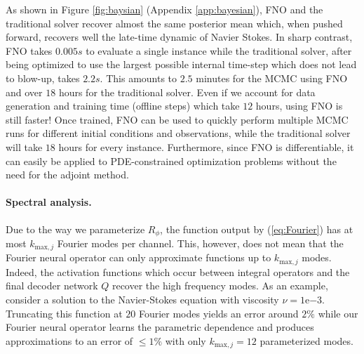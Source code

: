 \documentclass{article} %
\newcommand{\zongyi}[1]{\textcolor{green}{{\bf Zongyi:}  #1}}
\begin{document}
As shown in Figure \ref{fig:baysian} (Appendix \ref{app:bayesian}), FNO and the traditional solver recover almost the same posterior mean which, when pushed forward, recovers well the late-time dynamic of Navier Stokes. 
In sharp contrast, FNO takes $0.005s$ to evaluate a single instance while the traditional solver, after being optimized to use the largest possible internal time-step which does not lead to blow-up, takes $2.2s$. This amounts to $2.5$ minutes for the MCMC using FNO and over $18$ hours for the traditional solver. Even if we account for data generation and training time (offline steps) which take $12$ hours, using FNO is still faster! Once trained, FNO can be used to quickly perform multiple MCMC runs for different initial conditions and observations, while the traditional solver will take $18$ hours for every instance. Furthermore, since FNO is differentiable, it can easily be applied to PDE-constrained optimization problems without the need for the adjoint method.


\paragraph{Spectral analysis.}
Due to the way we parameterize $R_\phi$, the function output by (\ref{eq:Fourier}) has at most $k_{\text{max},j}$ Fourier modes per channel. This, however, does not mean that the Fourier neural operator can only approximate functions up to $k_{\text{max},j}$ modes. Indeed, the activation functions which occur between integral operators and the final decoder network $Q$ recover the high frequency modes.
As an example, consider a solution to the Navier-Stokes equation with viscosity $\nu=1\mathrm{e}{-3}$. Truncating this function at $20$ Fourier modes yields an error around $2\%$ 
while our Fourier neural operator learns the parametric dependence and produces approximations to an error of $\leq 1\%$ with only $k_{\text{max},j}=12$ parameterized modes.
\end{document}
